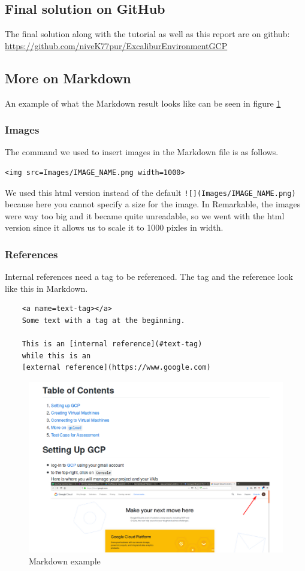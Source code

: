 \subsection{Final solution on GitHub}\label{app:github}

The final solution along with the tutorial as well as this report are
on github: \url{https://github.com/niveK77pur/ExcaliburEnvironmentGCP}

\subsection{More on Markdown}\label{app:markdown}

An example of what the Markdown result looks like can be seen in
figure \ref{fig:markdown}

\subsubsection{Images}

The command we used to insert
images in the Markdown file is as follows.

\begin{verbatim}
<img src=Images/IMAGE_NAME.png width=1000>
\end{verbatim}

We used this html version instead of the default
\verb|![](Images/IMAGE_NAME.png)| because here you cannot specify a
size for the image. In Remarkable, the images were way too big and it
became quite unreadable, so we went with the html version since it
allows us to scale it to 1000 pixles in width.

\subsubsection{References}

Internal references need a tag to be
referenced. The tag and the reference look like this in Markdown.

\begin{verbatim}
	<a name=text-tag></a>
	Some text with a tag at the beginning.

	This is an [internal reference](#text-tag)
	while this is an
	[external reference](https://www.google.com)
\end{verbatim}

\begin{figure}
	\centering
	\includegraphics[width=.5\textwidth]{Images/markdown-showcase.png}
	\caption{Markdown example}
	\label{fig:markdown}
\end{figure}

